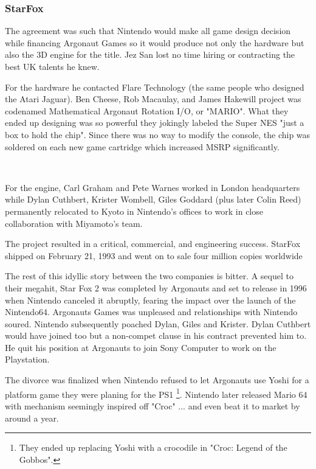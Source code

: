 \subsubsection{StarFox}
The agreement was such that Nintendo would make all game design decision while financing Argonaut Games so it would produce not only the hardware but also the 3D engine for the title. Jez San lost no time hiring or contracting the best UK talents he knew.\\
\par
For the hardware he contacted Flare Technology (the same people who designed the Atari Jaguar). Ben Cheese, Rob Macaulay, and James Hakewill project was codenamed Mathematical Argonaut Rotation I/O, or "MARIO". What they ended up designing was so powerful they jokingly labeled the Super NES "just a box to hold the chip". Since there was no way to modify the console, the chip was soldered on each new game cartridge which increased MSRP significantly.\\
\par
{}\\
\par
For the engine, Carl Graham and Pete Warnes worked in London headquarters while Dylan Cuthbert, Krister Wombell, Giles Goddard (plus later Colin Reed) permanently relocated to Kyoto in Nintendo's offices to work in close collaboration with Miyamoto's team.\\ 
\par
The project resulted in a critical, commercial, and engineering success. StarFox shipped on February 21, 1993 and went on to sale four million copies worldwide\\
 \par

The rest of this idyllic story between the two companies is bitter. A sequel to their megahit, Star Fox 2 was completed by Argonauts and set to release in 1996 when Nintendo canceled it abruptly, fearing the impact over the launch of the Nintendo64. Argonauts Games was unpleased and relationships with Nintendo soured. Nintendo subsequently poached Dylan, Giles and Krister. Dylan Cuthbert would have joined too but a non-compet clause in his contract prevented him to. He quit his position at Argonauts to join Sony Computer to work on the Playstation.\\
\par
The divorce was finalized when Nintendo refused to let Argonauts use Yoshi for a platform game they were planing for the PS1 \footnote{They ended up replacing Yoshi with a crocodile in "Croc: Legend of the Gobbos".}. Nintendo later released Mario 64 with mechanism seemingly inspired off "Croc" ... and even beat it to market by around a year.





